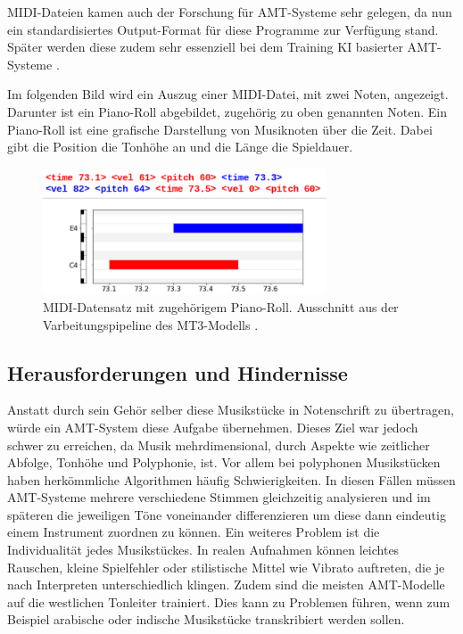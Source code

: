 \begin{description}[style=nextline]
MIDI-Dateien kamen auch der Forschung für AMT-Systeme sehr gelegen,
da nun ein standardisiertes Output-Format für diese Programme zur Verfügung stand.
Später werden diese zudem sehr essenziell bei dem Training KI basierter AMT-Systeme \cite{telila2025cnn}.

Im folgenden Bild wird ein Auszug einer MIDI-Datei, mit zwei Noten, angezeigt.
Darunter ist ein Piano-Roll abgebildet, zugehörig zu oben genannten Noten.
Ein Piano-Roll ist eine grafische Darstellung von Musiknoten über die Zeit.
Dabei gibt die Position die Tonhöhe an und die Länge die Spieldauer.
\begin{figure}[H]
    \centering
    \includegraphics[width=0.75\textwidth]{Graphics/midi_pianoroll}
    \caption[MIDI-Datensatz]{MIDI-Datensatz mit zugehörigem Piano-Roll. Ausschnitt aus der Varbeitungspipeline des MT3-Modells  \cite{mt3colab}.}
    \label{fig:mt3_output_tokens}
\end{figure}
\end{description}

\subsection{Herausforderungen und Hindernisse}
Anstatt durch sein Gehör selber diese Musikstücke in Notenschrift zu übertragen,
würde ein AMT-System diese Aufgabe übernehmen.
Dieses Ziel war jedoch schwer zu erreichen,
da Musik mehrdimensional, durch Aspekte wie zeitlicher Abfolge, Tonhöhe und Polyphonie, ist.
Vor allem bei polyphonen Musikstücken haben herkömmliche Algorithmen häufig Schwierigkeiten.
In diesen Fällen müssen AMT-Systeme mehrere verschiedene Stimmen gleichzeitig analysieren und
im späteren die jeweiligen Töne voneinander differenzieren um diese dann eindeutig einem Instrument zuordnen zu können.
Ein weiteres Problem ist die Individualität jedes Musikstückes.
In realen Aufnahmen können leichtes Rauschen,
kleine Spielfehler oder stilistische Mittel wie Vibrato auftreten,
die je nach Interpreten unterschiedlich klingen.
Zudem sind die meisten AMT-Modelle auf die westlichen Tonleiter trainiert.
Dies kann zu Problemen führen, wenn zum Beispiel
arabische oder indische Musikstücke transkribiert werden sollen.


